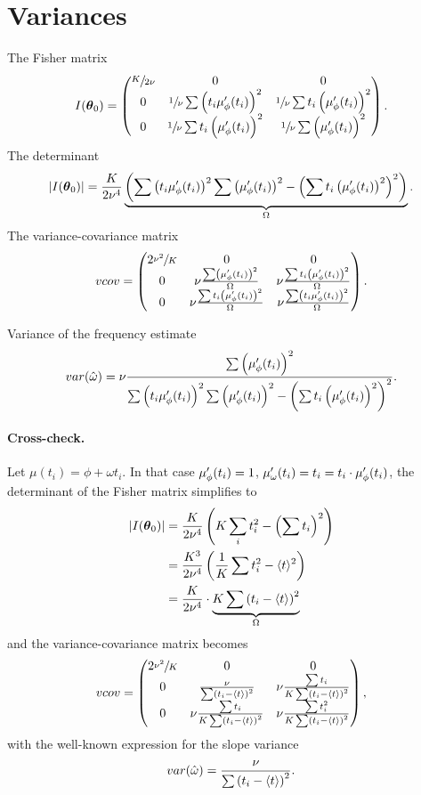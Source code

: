 \documentclass{article}
\newcommand{\pars}{\boldsymbol{\theta}}
\begin{document}
\section{Variances}

The Fisher matrix
\[
	I(\pars_0) = \begin{pmatrix}
	\sfrac{K}{2\nu} & 0 								& 0 \\
	0 				& \sfrac1\nu\sum\bkt{t_i\mupp}^2	& \sfrac1\nu\sum t_i\bkt{\mupp}^2 \\
	0				& \sfrac1\nu\sum t_i\bkt{\mupp}^2	&\sfrac1\nu\sum\bkt{\mupp}^2
	\end{pmatrix}.
\]
The determinant
\newcommand{\STM}{\Omega}
\[
	|I(\pars_0)| = \frac{K}{2\nu^4}\underbrace{\bkt{\sum\bkt{t_i\mupp}^2\sum\bkt{\mupp}^2 - \bkt{\sum t_i\bkt{\mupp}^2}^2}}_{\STM}.
\]
The variance-covariance matrix
\[
vcov = \begin{pmatrix}
	2\sfrac{\nu^2}{K}& 0									& 0				\\
	0				&\nu\frac{\sum\bkt{\mupp}^2}{\STM}		&\nu\frac{\sum t_i\bkt{\mupp}^2}{\STM}\\
	0				&\nu\frac{\sum t_i\bkt{\mupp}^2}{\STM}	&\nu\frac{\sum\bkt{t_i\mupp}^2}{\STM}
\end{pmatrix}.
\]

Variance of the frequency estimate
\[
	var(\hat{\omega}) = \nu\frac{\sum\bkt{\mupp}^2}{\sum\bkt{t_i\mupp}^2\sum\bkt{\mupp}^2 - \bkt{\sum t_i\bkt{\mupp}^2}^2}.
\]

\newcommand{\avg}[1]{\langle #1\rangle}
\paragraph{Cross-check.} Let $\mu(t_i) = \phi + \omega t_i$. In that case $\mupp = 1$, $\mu'_\omega(t_i) = t_i = t_i\cdot\mupp$, the determinant of the Fisher matrix simplifies to 
\begin{align*}
	|I(\pars_0)| &= \frac{K}{2\nu^4}\bkt{K\sum_i t_i^2 - \bkt{\sum t_i}^2} \\
				 &= \frac{K^3}{2\nu^4}\bkt{\frac1K\sum t_i^2 - \avg{t}^2} \\
				 &= \frac{K}{2\nu^4}\cdot\underbrace{K\sum\bkt{t_i - \avg{t}}^2}_{\STM}
\end{align*}
\newcommand{\SSX}{\sum\bkt{t_i - \avg{t}}^2}
and the variance-covariance matrix becomes
\[
vcov = \begin{pmatrix}
	2\sfrac{\nu^2}{K}& 0									& 0				\\
	0				&\frac{\nu}{\SSX}		&\nu\frac{\sum t_i}{K\SSX}\\
	0				&\nu\frac{\sum t_i}{K\SSX}	&\nu\frac{\sum t_i^2}{K\SSX}
\end{pmatrix},
\]
with the well-known expression for the slope variance
\[
	var(\hat\omega) = \frac{\nu}{\SSX}.
\]
\end{document}
